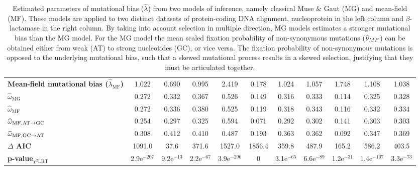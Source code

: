 \documentclass{article}
\begin{document}
\begin{table}[h]
{\begin{tabu}{l||c|c|c|c|c|c|c|c|c|c|}
        \textbf{Mean-field mutational bias ($\widehat{\lambda}_{\text{{MF}}}$)}         &         1.022 &        0.690 &        0.995 &                  2.419 &                  0.178 &            1.024 &         1.057 &        1.748 &         1.108 &        1.038 \\
        $\widehat{\omega}_{\text{{MG}}}$              &         0.272 &        0.332 &        0.367 &                  0.526 &                  0.149 &            0.316 &         0.333 &        0.114 &         0.325 &        0.328 \\
        $\widehat{\omega}_{\text{{MF}}}$              &         0.272 &        0.336 &        0.380 &                  0.525 &                  0.119 &            0.318 &         0.343 &        0.116 &         0.332 &        0.334 \\
        $\widehat{\omega}_{\text{{MF}},\text{AT} \rightarrow \text{GC}}$           &         0.254 &        0.297 &        0.325 &                  0.594 &                  0.071 &            0.292 &         0.302 &        0.141 &         0.303 &        0.303 \\
        $\widehat{\omega}_{\text{{MF}},\text{GC} \rightarrow \text{AT}}$           &         0.308 &        0.412 &        0.410 &                  0.487 &                  0.193 &            0.363 &         0.362 &        0.092 &         0.347 &        0.369 \\
        \textbf{$\Delta$ AIC}          &        1091.0 &         37.6 &        371.6 &                 1527.0 &                 1856.4 &            359.8 &         487.9 &        165.2 &         586.2 &        403.5 \\
        \textbf{p-value$_{\chi^2 \text{LRT}}$}    & 2.9e$^{-207}$ & 9.2e$^{-13}$ & 2.2e$^{-67}$ &          3.9e$^{-296}$ &                      0 &     3.1e$^{-65}$ &  6.6e$^{-89}$ & 1.2e$^{-31}$ & 1.4e$^{-107}$ & 3.3e$^{-73}$ \\
    \end{tabu}}
    \caption[Estimated parameters]{
        Estimated parameters of mutational bias ($\widehat{\lambda}$) from two models of inference, namely classical Muse \& Gaut ({MG}) and mean-field ({MF}).
        These models are applied to two distinct datasets of protein-coding {DNA} alignment, nucleoprotein in the left column and $\beta$-lactamase in the right column.
        By taking into account selection in multiple direction, {MG} models estimates a stronger mutational bias than the {MG} model.
        For the {MG} model the mean scaled fixation probability of {non-synonymous} mutations ($\widehat{\nu}_{MF}$) can be obtained either from weak (AT) to strong nucleotides (GC), or vice versa.
        The fixation probability of {non-synonymous} mutations is opposed to the underlying mutational bias, such that a skewed mutational process results in a skewed selection, justifying that they must be articulated together.
    }
    \label{tab:mut-bias-estimation}
\end{table}
\end{document}
